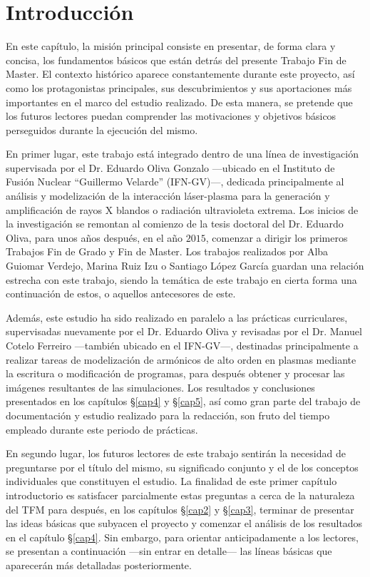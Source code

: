 \chapter{Introducción} \label{cap1}
En este capítulo, la misión principal consiste en presentar, de forma clara y concisa, los fundamentos básicos que están detrás del presente Trabajo Fin de Master. El contexto histórico aparece constantemente durante este proyecto, así como los protagonistas principales, sus descubrimientos y sus aportaciones más importantes en el marco del estudio realizado. De esta manera, se pretende que los futuros lectores puedan comprender las motivaciones y objetivos básicos perseguidos durante la ejecución del mismo.

En primer lugar, este trabajo está integrado dentro de una línea de investigación supervisada por el Dr. Eduardo Oliva Gonzalo 
---ubicado en el Instituto de Fusión Nuclear \enquote{Guillermo Velarde} (IFN-GV)---, dedicada principalmente al análisis y modelización de la interacción láser-plasma para la generación y amplificación de rayos X blandos o radiación ultravioleta extrema. Los inicios de la investigación se remontan al comienzo de la tesis doctoral del Dr. Eduardo Oliva\autocite{Oliva2010MejoraX}, para unos años después, en el año $2015$, comenzar a dirigir los primeros Trabajos Fin de Grado y Fin de Master. Los trabajos realizados por Alba Guiomar Verdejo, Marina Ruiz Izu o Santiago López García guardan una relación estrecha con este trabajo, siendo la temática de este trabajo en cierta forma una continuación de estos, o aquellos antecesores de este.

Además, este estudio ha sido realizado en paralelo a las prácticas curriculares, supervisadas nuevamente por el Dr. Eduardo Oliva y revisadas por el Dr. Manuel Cotelo Ferreiro ---también ubicado en el IFN-GV---, destinadas principalmente a realizar tareas de modelización de armónicos de alto orden en plasmas mediante la escritura o modificación de programas, para después obtener y procesar las imágenes resultantes de las simulaciones. Los resultados y conclusiones presentados en los capítulos \S\ref{cap4} y \S\ref{cap5}, así como gran parte del trabajo de documentación y estudio realizado para la redacción, son fruto del tiempo empleado durante este periodo de prácticas.

En segundo lugar, los futuros lectores de este trabajo sentirán la necesidad de preguntarse por el título del mismo, su significado conjunto y el de los conceptos individuales que constituyen el estudio. La finalidad de este primer capítulo introductorio es satisfacer parcialmente estas preguntas a cerca de la naturaleza del TFM para después, en los capítulos \S\ref{cap2} y \S\ref{cap3}, terminar de presentar las ideas básicas que subyacen el proyecto y comenzar el análisis de los resultados en el capítulo \S\ref{cap4}. Sin embargo, para orientar anticipadamente a los lectores, se presentan a continuación ---sin entrar en detalle--- las líneas básicas que aparecerán más detalladas posteriormente.


